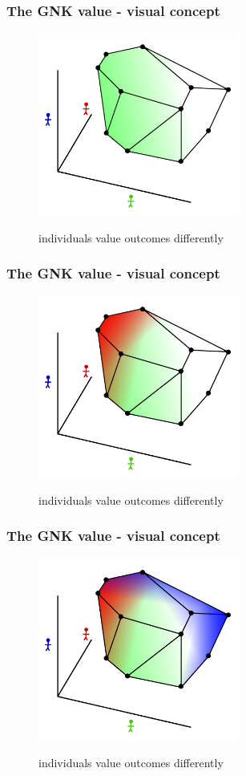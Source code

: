 \begin{frame} \frametitle{The GNK value - visual concept} \begin{figure} \begin{center} \includegraphics[height=6cm]{figs/pp6} \end{center} individuals value outcomes differently \end{figure} \end{frame}
\begin{frame} \frametitle{The GNK value - visual concept} \begin{figure} \begin{center} \includegraphics[height=6cm]{figs/pp7} \end{center} individuals value outcomes differently \end{figure} \end{frame}
\begin{frame} \frametitle{The GNK value - visual concept} \begin{figure} \begin{center} \includegraphics[height=6cm]{figs/pp8} \end{center} individuals value outcomes differently \end{figure} \end{frame}
